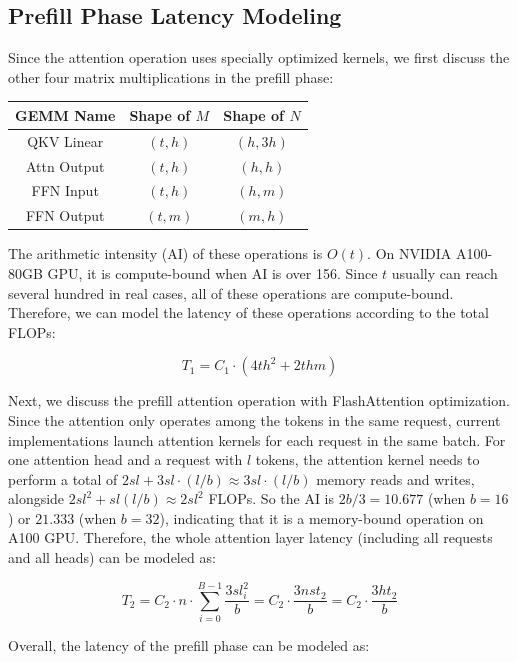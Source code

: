 \subsection{Prefill Phase Latency Modeling}

Since the attention operation uses specially optimized kernels, we first discuss the other four matrix multiplications in the prefill phase:

\begin{table}[h]
\centering
\begin{tabular}{|c|c|c|}
    \hline
    GEMM Name & Shape of $M$ & Shape of $N$ \\ \hline
    QKV Linear & $(t, h)$ & $(h, 3h)$ \\ \hline
    Attn Output & $(t, h)$ & $(h, h)$ \\ \hline
    FFN Input & $(t, h)$ & $(h, m)$ \\ \hline
    FFN Output & $(t, m)$ & $(m, h)$ \\ \hline
\end{tabular}
\end{table}

The arithmetic intensity (AI) of these operations is $O(t)$. On NVIDIA A100-80GB GPU, it is compute-bound when AI is over 156. Since $t$ usually can reach several hundred in real cases, all of these operations are compute-bound. Therefore, we can model the latency of these operations according to the total FLOPs:

$$T_1 = C_1 \cdot (4th^2 + 2thm)$$

Next, we discuss the prefill attention operation with FlashAttention\cite{dao2022flashattention} optimization. Since the attention only operates among the tokens in the same request, current implementations launch attention kernels for each request in the same batch. For one attention head and a request with $l$ tokens, the attention kernel needs to perform a total of $2sl + 3sl\cdot(l/b) \approx 3sl\cdot(l/b)$ memory reads and writes, alongside $2sl^2 + sl(l/b) \approx 2sl^2$ FLOPs. So the AI is $2b/3 = 10.677$ (when $b=16$) or $21.333$ (when $b=32$), indicating that it is a memory-bound operation on A100 GPU. Therefore, the whole attention layer latency (including all requests and all heads) can be modeled as:

$$T_2 = C_2 \cdot n \cdot \sum_{i=0}^{B-1} \frac{3sl_i^2}{b} = C_2 \cdot \frac{3nst_2}{b} = C_2 \cdot \frac{3ht_2}{b}$$

Overall, the latency of the prefill phase can be modeled as:

